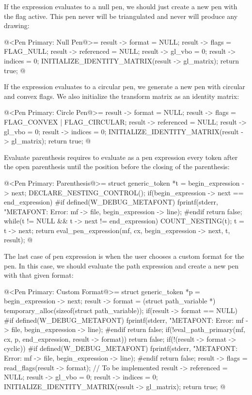 {{{{{If the expression evaluates to a null pen, we should just create a new
pen with the flag  active. This pen never will
be triangulated and never will produce any drawing:

\iniciocodigo
@<Pen Primary: Null Pen@>=
result -> format = NULL;
result -> flags = FLAG_NULL;
result -> referenced = NULL;
result -> gl_vbo = 0;
result -> indices = 0;
INITIALIZE_IDENTITY_MATRIX(result -> gl_matrix);
return true;
@
\fimcodigo

If the expression evaluates to a circular pen, we generate a new pen
with circular and convex flags. We also initialize the transform
matrix as an identity matrix:

\iniciocodigo
@<Pen Primary: Circle Pen@>=
result -> format = NULL;
result -> flags = FLAG_CONVEX | FLAG_CIRCULAR;
result -> referenced = NULL;
result -> gl_vbo = 0;
result -> indices = 0;
INITIALIZE_IDENTITY_MATRIX(result -> gl_matrix);
return true;
@
\fimcodigo

Evaluate parenthesis requires to evaluate as a pen expression every
token after the open parenthesis until the position before the closing
of the parenthesis:

\iniciocodigo
@<Pen Primary: Parenthesis@>=
struct generic_token *t = begin_expression -> next;
DECLARE_NESTING_CONTROL();
if(begin_expression -> next == end_expression){
#if defined(W_DEBUG_METAFONT)
  fprintf(stderr, "METAFONT: Error: %
          mf -> file, begin_expression -> line);
#endif
  return false;
}
while(t != NULL && t -> next != end_expression){
  COUNT_NESTING(t);
  t = t -> next;
}
return eval_pen_expression(mf, cx, begin_expression -> next, t, result);
@
\fimcodigo

The last case of pen expression is when the user chooses a custom
format for the pen. In this case, we should evaluate the path
expression and create a new pen with that given format:

\iniciocodigo
@<Pen Primary: Custom Format@>=
struct generic_token *p = begin_expression -> next;
result -> format =
        (struct path_variable *) temporary_alloc(sizeof(struct path_variable));
if(result -> format == NULL){
#if defined(W_DEBUG_METAFONT)
  fprintf(stderr, "METAFONT: Error: %
          mf -> file, begin_expression -> line);
#endif
  return false;
}
if(!eval_path_primary(mf, cx, p, end_expression, result -> format))
  return false;
if(!(result -> format -> cyclic)){
#if defined(W_DEBUG_METAFONT)
  fprintf(stderr,
          "METAFONT: Error: %
          mf -> file, begin_expression -> line);
#endif
  return false;
}
result -> flags = read_flags(result -> format); // To be implemented
result -> referenced = NULL;
result -> gl_vbo = 0;
result -> indices = 0;
INITIALIZE_IDENTITY_MATRIX(result -> gl_matrix);
return true;
@
\fimcodigo

}}}}}
